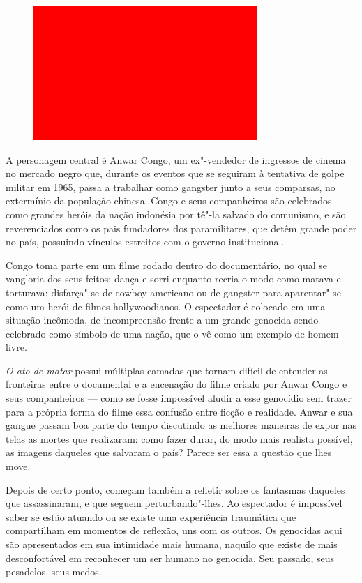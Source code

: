 \begin{figure}[!ht]
\centering
 \includegraphics[width=85mm]{./imgs/im1.jpg}
\caption{\footnotesize{}}
\end{figure}


A personagem central é Anwar Congo, um ex"-vendedor de ingressos de
cinema no mercado negro que, durante os eventos que se seguiram à
tentativa de golpe militar em 1965, passa a trabalhar como gangster
junto a seus comparsas, no extermínio da população chinesa. Congo e seus
companheiros são celebrados como grandes heróis da nação indonésia por
tê"-la salvado do comunismo, e são reverenciados como os pais fundadores
dos paramilitares, que detêm grande poder no país, possuindo vínculos
estreitos com o governo institucional.

Congo toma parte em um filme rodado dentro do documentário, no qual se
vangloria dos seus feitos: dança e sorri enquanto recria o modo como
matava e torturava; disfarça"-se de cowboy americano ou de gangster para
aparentar"-se como um herói de filmes hollywoodianos. O espectador é
colocado em uma situação incômoda, de incompreensão frente a um grande
genocida sendo celebrado como símbolo de uma nação, que o vê como um
exemplo de homem livre.

\emph{O ato de matar} possui múltiplas camadas que tornam difícil de
entender as fronteiras entre o documental e a encenação do filme criado
por Anwar Congo e seus companheiros --- como se fosse impossível aludir a
esse genocídio sem trazer para a própria forma do filme essa confusão
entre ficção e realidade. Anwar e sua gangue passam boa parte do tempo
discutindo as melhores maneiras de expor nas telas as mortes que
realizaram: como fazer durar, do modo mais realista possível, as imagens
daqueles que salvaram o país? Parece ser essa a questão que lhes move.

Depois de certo ponto, começam também a refletir sobre os fantasmas
daqueles que assassinaram, e que seguem perturbando"-lhes. Ao espectador
é impossível saber se estão atuando ou se existe uma experiência
traumática que compartilham em momentos de reflexão, uns com os outros.
Os genocidas aqui são apresentados em sua intimidade mais humana,
naquilo que existe de mais desconfortável em reconhecer um ser humano no
genocida. Seu passado, seus pesadelos, seus medos.

